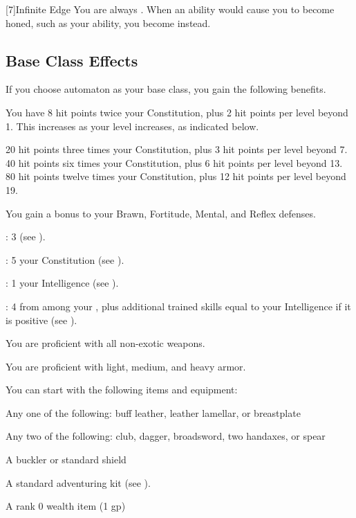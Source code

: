     [7]{Infinite Edge} You are always \honed.
    When an ability would cause you to become honed, such as your  ability, you become \empowered instead.

  \subsection{Base Class Effects}
    \highhpprogressiontable

    If you choose automaton as your base class, you gain the following benefits.

      You have 8 hit points \add twice your Constitution, plus 2 hit points per level beyond 1.
      This increases as your level increases, as indicated below.
      \begin{raggeditemize}
         20 hit points \add three times your Constitution, plus 3 hit points per level beyond 7.
         40 hit points \add six times your Constitution, plus 6 hit points per level beyond 13.
         80 hit points \add twelve times your Constitution, plus 12 hit points per level beyond 19.
      \end{raggeditemize}

      You gain a  bonus to your Brawn, Fortitude, Mental, and Reflex defenses.

      \begin{raggeditemize}
          \item {}: 3 (see ).
          \item {}: 5 \add your Constitution (see ).
          \item {}: 1 \add your Intelligence (see ).
          \item {}: 4 from among your , plus additional trained skills equal to your Intelligence if it is positive (see ).
      \end{raggeditemize}

      You are proficient with all non-exotic weapons.

      You are proficient with light, medium, and heavy armor.

    You can start with the following items and equipment:
    \begin{raggeditemize}
        \item Any one of the following: buff leather, leather lamellar, or breastplate
        \item Any two of the following: club, dagger, broadsword, two handaxes, or spear
        \item A buckler or standard shield
        \item A standard adventuring kit (see ).
        \item A rank 0 wealth item (1 gp)
    \end{raggeditemize}

